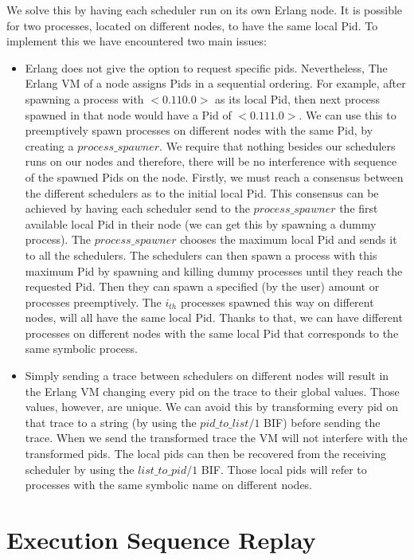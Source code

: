 We solve this by having each scheduler run on its own Erlang node. It is possible for two processes, located on different nodes,
to have the same local Pid. To implement this we have encountered two main issues:
\begin{itemize}
    \item Erlang does not give the option to request specific pids. Nevertheless, The Erlang VM of a node assigns Pids in a sequential ordering. For example,
    after spawning a process with $<0.110.0>$ as its local Pid, then next process spawned in that node would have a Pid of $<0.111.0>$. We can use this
    to preemptively spawn processes on different nodes with the same Pid, by creating a $process\_spawner$.
    We require that nothing besides our schedulers runs on our nodes
    and therefore, there will be no interference with sequence of the spawned Pids on the node. Firstly, we must reach a consensus between the different
    schedulers as to the initial local Pid. This consensus can be achieved by having each scheduler send to the $process\_spawner$ the first available
    local Pid in their node (we can get this by spawning a dummy process). The $process\_spawner$ chooses the maximum local Pid and sends it to all the schedulers.
    The schedulers can then spawn a process with this maximum Pid by spawning and killing dummy processes until they reach the requested Pid. Then they can
    spawn a specified (by the user) amount or processes preemptively. The $i_{th}$ processes spawned this way on different nodes, will all have the same local Pid.
    Thanks to that, we can have different processes on different nodes with the same local Pid that corresponds to the same symbolic process. 
    \item Simply sending a trace between schedulers on different nodes will result in the Erlang VM changing every pid on the trace to their global values.
    Those values, however, are unique. We can avoid this by transforming every pid on that trace to a string (by using the $pid\_to\_list/1$ BIF) before
    sending the trace. When we send the transformed trace the VM will not interfere with the transformed pids. The local pids can then be recovered from
    the receiving scheduler by using the $list\_to\_pid/1$ BIF. Those local pids will refer to processes with the same symbolic name on different nodes. 
\end{itemize}

\section{Execution Sequence Replay}

